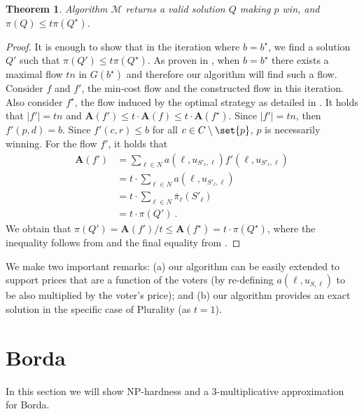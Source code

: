 \documentclass[letterpaper]{article} %
\newtheorem{theorem}{Theorem}
\newcommand{\vecc}{\mathbf}
\newcommand{\Cmp}{C \setminus \set{p}}
\newcommand{\abs}[1]{\lvert{#1}\rvert}
\newcommand{\Aoper}[1]{\vecc{A}({#1})}
\newcommand{\NP}{\mathrm{NP}}
\begin{document}
\begin{theorem}
Algorithm $\mathcal{M}$ returns a valid solution $Q$ making $p$ win, and $\pi(Q) \leq t \pi(Q^{\star})$.
\end{theorem}
\begin{proof}
It is enough to show that in the iteration where $b = b^{\star}$, we find a solution  $Q' $ such that $\pi(Q' ) \leq t \pi(Q^{\star})$.
As proven in , when $b = b^{\star}$ there exists a maximal flow $tn$ in $G(b^{\star})$ and therefore our algorithm will find such a flow. Consider $f$ and $f'$, the min-cost flow and the constructed flow in this iteration. Also consider  $f^\star$, the flow induced by the optimal strategy as detailed in .
It holds that $\abs{f'} = tn$ and $\Aoper{f'} \leq t \cdot \Aoper{f} \leq t \cdot \Aoper{f^\star} $. Since $\abs{f'} = tn$, then $f'(p,d)=b$. Since $f'(c,r)\leq b$ for all $c \in \Cmp$, $p$ is necessarily winning.
For the flow $f'$,  it holds that
\begin{align*}
    \Aoper{f'} &= \sum_{\ell \in N}a(\ell, u_{S'_\ell, \ell})f'(\ell, u_{S'_\ell, \ell})\\
    &= t \cdot \sum_{\ell \in N}a(\ell, u_{S'_\ell, \ell})\\
    &=  t \cdot \sum_{\ell \in N}\bar{\pi}_{\ell}(S'_\ell)\\
    &= t\cdot \pi(Q')\ .
\end{align*}
We obtain that $\pi(Q') = \Aoper{f'}/t \leq  \Aoper{f^\star} = t \cdot \pi(Q^\star)$, where the inequality follows from  and the final equality from .
\end{proof}
We make two important remarks: (a) our algorithm can be easily extended to support prices that are a function of the voters (by re-defining $a(\ell, u_{S,\ell})$ to be also multiplied by the voter's price); and (b) our algorithm provides an exact solution in the specific case of Plurality (as $t=1$).
\section{Borda}
In this section we will show $\NP$-hardness and a $3$-multiplicative approximation for Borda.
\end{document}

